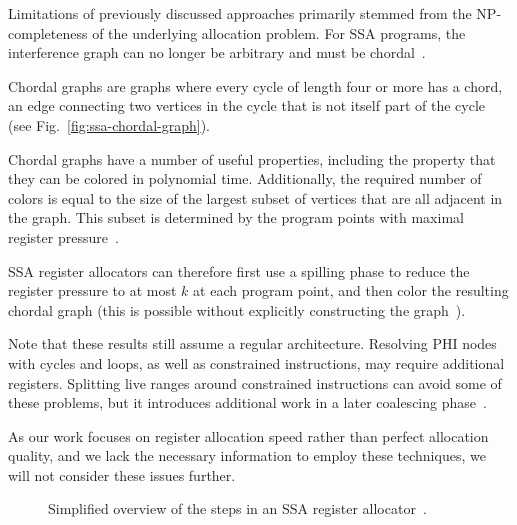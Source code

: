 Limitations of previously discussed approaches primarily stemmed from the NP-completeness of the underlying allocation problem. For SSA programs, the interference graph can no longer be arbitrary and must be chordal~\cite{hack-chordal}.

Chordal graphs are graphs where every cycle of length four or more has a chord, an edge connecting two vertices in the cycle that is not itself part of the cycle (see Fig.~\ref{fig:ssa-chordal-graph}). 

Chordal graphs have a number of useful properties, including the property that they can be colored in polynomial time.
Additionally, the required number of colors is equal to the size of the largest subset of vertices that are all adjacent in the graph. This subset is determined by the program points with maximal register pressure~\cite{hack-thesis}.

SSA register allocators can therefore first use a spilling phase to reduce the register pressure to at most $k$ at each program point, and then color the resulting chordal graph (this is possible without explicitly constructing the graph~\cite{hack-thesis}).

Note that these results still assume a regular architecture.
Resolving PHI nodes with cycles and loops, as well as constrained instructions, may require additional registers. Splitting live ranges around constrained instructions can avoid some of these problems, but it introduces additional work in a later coalescing phase~\cite{hack-thesis}.

As our work focuses on register allocation speed rather than perfect allocation quality, and we lack the necessary information to employ these techniques, we will not consider these issues further.


\begin{figure}
\centering
{}
\caption{Simplified overview of the steps in an SSA register allocator~\cite{hack-thesis}.}
\label{fig:ssa-steps}
\end{figure}



